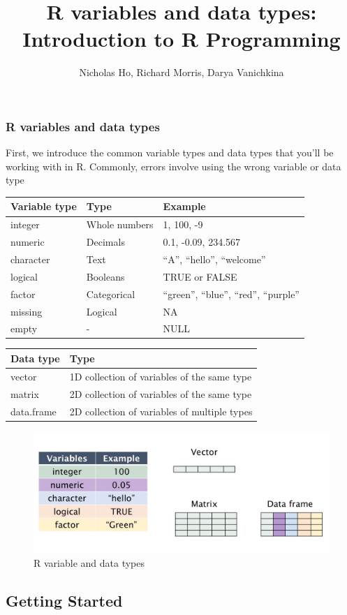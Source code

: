 \documentclass[]{article}
\title{R variables and data types: Introduction to R Programming}
\author{Nicholas Ho, Richard Morris, Darya Vanichkina}
\date{}
\begin{document}
\maketitle

\subsubsection{R variables and data
types}\label{r-variables-and-data-types}

First, we introduce the common variable types and data types that you'll
be working with in R. Commonly, errors involve using the wrong variable
or data type

\begin{longtable}[]{@{}lll@{}}
\toprule
\textbf{Variable type} & \textbf{Type} & \textbf{Example}\tabularnewline
\midrule
\endhead
integer & Whole numbers & 1, 100, -9\tabularnewline
numeric & Decimals & 0.1, -0.09, 234.567\tabularnewline
character & Text & ``A'', ``hello'', ``welcome''\tabularnewline
logical & Booleans & TRUE or FALSE\tabularnewline
factor & Categorical & ``green'', ``blue'', ``red'',
``purple''\tabularnewline
missing & Logical & NA\tabularnewline
empty & - & NULL\tabularnewline
\bottomrule
\end{longtable}

\begin{longtable}[]{@{}ll@{}}
\toprule
\textbf{Data type} & \textbf{Type}\tabularnewline
\midrule
\endhead
vector & 1D collection of variables of the same type\tabularnewline
matrix & 2D collection of variables of the same type\tabularnewline
data.frame & 2D collection of variables of multiple types\tabularnewline
\bottomrule
\end{longtable}

\begin{figure}
\centering
\includegraphics{Rvariablesdata.jpg}
\caption{R variable and data types}
\end{figure}

\subsection{Getting Started}\label{getting-started}
\end{document}
